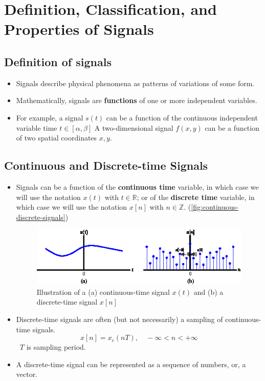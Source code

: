 \section{Definition, Classification, and Properties of Signals}
\subsection{Definition of signals}
\begin{itemize}
    \item  Signals describe physical phenomena as patterns of variations of some form.
    
    \item Mathematically, signals are \textbf{functions} of one or more independent variables.
    
    \item For example, a signal $s(t)$ can be a function of the continuous independent variable time $t \in [\alpha, \beta]$ A two-dimensional signal $f(x, y)$ can be a function of two spatial coordinates $x, y$.
\end{itemize}

\subsection{Continuous and Discrete-time Signals}
\begin{itemize}
    \item Signals can be a function of the \textbf{continuous time} variable, in which case we will use the notation $x(t)$ with $t \in \mathbb{R}$; or of the \textbf{discrete time} variable, in which case we will use the notation $x[n]$ with $n \in \mathbb{Z}$. (\autoref{fig:continuous-discrete-signals})
 
    \begin{figure}[H]
        \centering
        \includegraphics[width = .9\textwidth]{images/continuous_vs_discrete_signals.eps}
        \caption{Illustration of a (a) continuous-time signal $x(t)$ and (b) a discrete-time signal $x[n]$}
        \label{fig:continuous-discrete-signals}
    \end{figure}
 
    \item Discrete-time signals are often (but not necessarily) a sampling of continuous-time signals.
    \[ x[n] = x_{c}(nT), \quad -\infty < n < +\infty \]\ $T$ is sampling period.
 
    \item A discrete-time signal can be represented as a sequence of numbers, or, a vector.
\end{itemize}

